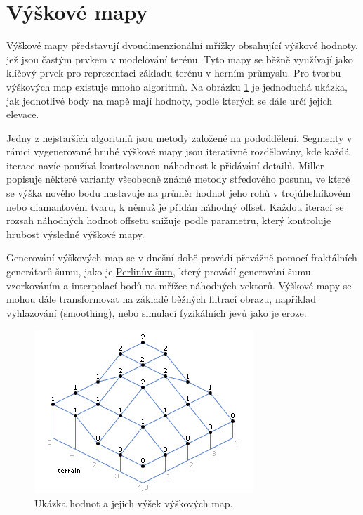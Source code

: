 \section{Výškové mapy}
\label{heightMaps}
Výškové mapy představují dvoudimenzionální mřížky obsahující výškové hodnoty, jež jsou častým prvkem v modelování terénu. Tyto mapy se běžně využívají jako klíčový prvek pro reprezentaci základu terénu v herním průmyslu. Pro tvorbu výškových map existuje mnoho algoritmů. Na obrázku \ref{HeightMap} je jednoduchá ukázka, jak jednotlivé body na mapě mají hodnoty, podle kterých se dále určí jejich elevace. \cite{heightMap08}

Jedny z nejstarších algoritmů jsou metody založené na pododdělení. Segmenty v rámci vygenerované hrubé výškové mapy jsou iterativně rozdělovány, kde každá iterace navíc používá kontrolovanou náhodnost k přidávání detailů. Miller \cite{MillerRendering} popisuje některé varianty všeobecně známé metody středového posunu, ve které se výška nového bodu nastavuje na průměr hodnot jeho rohů v trojúhelníkovém nebo diamantovém tvaru, k němuž je přidán náhodný offset. Každou iterací se rozsah náhodných hodnot offsetu snižuje podle parametru, který kontroluje hrubost výsledné výškové mapy. 

Generování výškových map se v dnešní době provádí převážně pomocí fraktálních generátorů šumu, jako je \hyperref[perlinNoise]{Perlinův šum}, který provádí generování šumu vzorkováním a interpolací bodů na mřížce náhodných vektorů. Výškové mapy se mohou dále transformovat na základě běžných filtrací obrazu, například vyhlazování (smoothing), nebo simulací fyzikálních jevů jako je eroze. \cite{inproceedings}

\begin{figure}[H]
	\centering
	\includegraphics[scale=0.9]{obrazky-figures/HeightMap.png}
	\caption{Ukázka hodnot a jejich výšek výškových map.}
	\label{HeightMap}
\end{figure}

